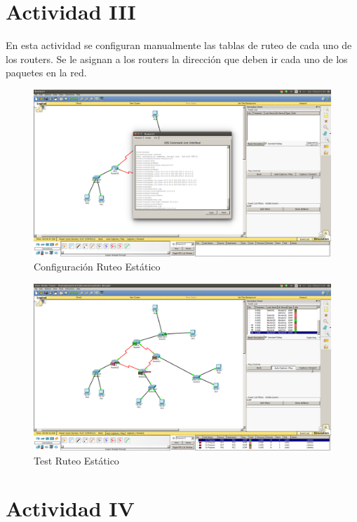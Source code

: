 \documentclass[spanish]{udpreport}
\begin{document}
\section{Actividad III}

En esta actividad se configuran manualmente las tablas de ruteo de cada uno de los routers. Se le asignan a los routers la dirección que deben ir cada uno de los paquetes en la red.

\begin{figure}[H]
	\centering
	\includegraphics[scale=.25]{imagenes/ruteo_estatico.png}
	\caption{Configuración Ruteo Estático}
	\label{fig:Figura 4.1}
\end{figure}

\begin{figure}[H]
	\centering
	\includegraphics[scale=.25]{imagenes/test_restatico.png}
	\caption{Test Ruteo Estático}
	\label{fig:Figura 4.2}
\end{figure}

\section{Actividad IV}
\end{document}
